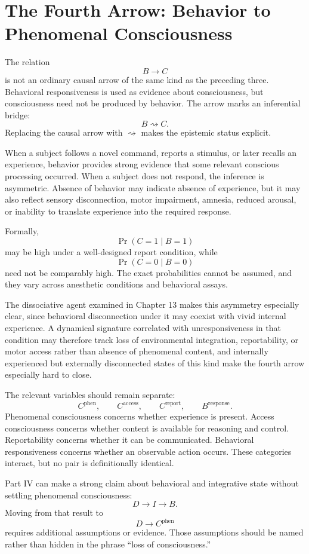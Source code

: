 \documentclass[11pt]{book}
\begin{document}
\section*{The Fourth Arrow: Behavior to Phenomenal Consciousness}

The relation
\[
B\longrightarrow C
\]
is not an ordinary causal arrow of the same kind as the preceding three. Behavioral responsiveness is used as evidence about consciousness, but consciousness need not be produced by behavior. The arrow marks an inferential bridge:
\[
B
\rightsquigarrow
C.
\]
Replacing the causal arrow with $\rightsquigarrow$ makes the epistemic status explicit.

When a subject follows a novel command, reports a stimulus, or later recalls an experience, behavior provides strong evidence that some relevant conscious processing occurred. When a subject does not respond, the inference is asymmetric. Absence of behavior may indicate absence of experience, but it may also reflect sensory disconnection, motor impairment, amnesia, reduced arousal, or inability to translate experience into the required response.

Formally,
\[
\Pr(C=1\mid B=1)
\]
may be high under a well-designed report condition, while
\[
\Pr(C=0\mid B=0)
\]
need not be comparably high. The exact probabilities cannot be assumed, and they vary across anesthetic conditions and behavioral assays.

The dissociative agent examined in Chapter 13 makes this asymmetry especially clear, since behavioral disconnection under it may coexist with vivid internal experience. A dynamical signature correlated with unresponsiveness in that condition may therefore track loss of environmental integration, reportability, or motor access rather than absence of phenomenal content, and internally experienced but externally disconnected states of this kind make the fourth arrow especially hard to close.

The relevant variables should remain separate:
\[
C^{\mathrm{phen}},
\qquad
C^{\mathrm{access}},
\qquad
C^{\mathrm{report}},
\qquad
B^{\mathrm{response}}.
\]
Phenomenal consciousness concerns whether experience is present. Access consciousness concerns whether content is available for reasoning and control. Reportability concerns whether it can be communicated. Behavioral responsiveness concerns whether an observable action occurs. These categories interact, but no pair is definitionally identical.

Part IV can make a strong claim about behavioral and integrative state without settling phenomenal consciousness:
\[
D\longrightarrow
I\longrightarrow
B.
\]
Moving from that result to
\[
D\longrightarrow C^{\mathrm{phen}}
\]
requires additional assumptions or evidence. Those assumptions should be named rather than hidden in the phrase ``loss of consciousness.''
\end{document}
